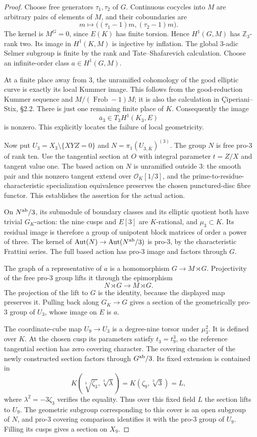 \documentclass[11pt,oneside]{article}
\begin{document}
\begin{proof}
Choose free generators $\tau_1,\tau_2$ of
$G$. Continuous cocycles into $M$ are
arbitrary pairs of elements of $M$,
and their coboundaries are
\[
 m\longmapsto
 \bigl((\tau_1-1)m,(\tau_2-1)m\bigr).
\]
The kernel is $M^G=0$, since $E(K)$ has
finite torsion. Hence $H^1(G,M)$ has
$\mathbb Z_3$-rank two. Its image in
$H^1(K,M)$ is injective by inflation.
The global $3$-adic Selmer subgroup is
finite by the rank and Tate--Shafarevich
calculation. Choose an infinite-order
class $a\in H^1(G,M)$.

At a finite place away from $3$, the
unramified cohomology of the good elliptic
curve is exactly its local Kummer image.
This follows from the good-reduction
Kummer sequence and
$M/(\operatorname{Frob}-1)M$; it is also
the calculation in
\c{C}iperiani--Stix, \S2.2.
There is just one remaining finite place
of $K$. Consequently the image
\[
 \overline a_3\in T_3H^1(K_3,E)
\]
is nonzero. This explicitly locates the
failure of local geometricity.

Now put $U_3=X_3\setminus\{XYZ=0\}$ and
$N=\pi_1(U_{3,\overline K})^{(3)}$.
The group $N$ is free pro-$3$ of rank ten.
Use the tangential section at $O$ with
integral parameter $t=Z/X$ and tangent
value one. The based action on $N$ is
unramified outside $3$: the smooth pair
and this nonzero tangent extend over
$\mathcal O_K[1/3]$, and the prime-to-residue-
characteristic specialization equivalence
preserves the chosen punctured-disc fibre
functor. This establishes the assertion
for the actual action.

On $N^{\rm ab}/3$, its submodule of
boundary classes and its elliptic
quotient both have trivial $G_K$-action:
the nine cusps and $E[3]$ are $K$-rational,
and $\mu_3\subset K$. Its residual image
is therefore a group of unipotent block
matrices of order a power of three.
The kernel of
$\operatorname{Aut}(N)\to
\operatorname{Aut}(N^{\rm ab}/3)$
is pro-$3$, by the characteristic
Frattini series. The full based action
has pro-$3$ image and factors through $G$.

The graph of a representative of $a$ is
a homomorphism $G\to M\rtimes G$.
Projectivity of the free pro-$3$ group
lifts it through the epimorphism
\[
 N\rtimes G\longrightarrow M\rtimes G.
\]
The projection of the lift to $G$ is
the identity, because the displayed
map preserves it. Pulling back along
$G_K\to G$ gives a section of the
geometrically pro-$3$ group of $U_3$,
whose image on $E$ is $a$.

The coordinate-cube map $U_9\to U_3$
is a degree-nine torsor under $\mu_3^2$.
It is defined over $K$. At the chosen
cusp its parameters satisfy $t_3=t_9^3$,
so the reference tangential section has
zero covering character. The covering
character of the newly constructed
section factors through
$G^{\rm ab}/3$. Its fixed extension is
contained in
\[
 K(\sqrt[3]{\zeta_3},\sqrt[3]{\lambda})
   =K(\zeta_9,\sqrt[3]{3})=L ,
\]
where $\lambda^2=-3\zeta_3$ verifies
the equality. Thus over this fixed
field $L$ the section lifts to $U_9$.
The geometric subgroup corresponding
to this cover is an open subgroup of
$N$, and pro-$3$ covering comparison
identifies it with the pro-$3$ group
of $U_9$. Filling its cusps gives a
section on $X_9$.


\end{proof}
\end{document}

